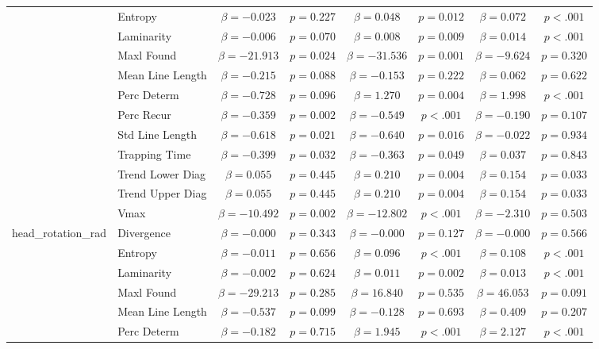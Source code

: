 \begin{tabular}{llcc|cc|cc}
 & Entropy & $\beta = -0.023$ & $p = 0.227$ & $\beta = 0.048$ & $p = 0.012$ & $\beta = 0.072$ & $p < .001$ \\
 & Laminarity & $\beta = -0.006$ & $p = 0.070$ & $\beta = 0.008$ & $p = 0.009$ & $\beta = 0.014$ & $p < .001$ \\
 & Maxl Found & $\beta = -21.913$ & $p = 0.024$ & $\beta = -31.536$ & $p = 0.001$ & $\beta = -9.624$ & $p = 0.320$ \\
 & Mean Line Length & $\beta = -0.215$ & $p = 0.088$ & $\beta = -0.153$ & $p = 0.222$ & $\beta = 0.062$ & $p = 0.622$ \\
 & Perc Determ & $\beta = -0.728$ & $p = 0.096$ & $\beta = 1.270$ & $p = 0.004$ & $\beta = 1.998$ & $p < .001$ \\
 & Perc Recur & $\beta = -0.359$ & $p = 0.002$ & $\beta = -0.549$ & $p < .001$ & $\beta = -0.190$ & $p = 0.107$ \\
 & Std Line Length & $\beta = -0.618$ & $p = 0.021$ & $\beta = -0.640$ & $p = 0.016$ & $\beta = -0.022$ & $p = 0.934$ \\
 & Trapping Time & $\beta = -0.399$ & $p = 0.032$ & $\beta = -0.363$ & $p = 0.049$ & $\beta = 0.037$ & $p = 0.843$ \\
 & Trend Lower Diag & $\beta = 0.055$ & $p = 0.445$ & $\beta = 0.210$ & $p = 0.004$ & $\beta = 0.154$ & $p = 0.033$ \\
 & Trend Upper Diag & $\beta = 0.055$ & $p = 0.445$ & $\beta = 0.210$ & $p = 0.004$ & $\beta = 0.154$ & $p = 0.033$ \\
 & Vmax & $\beta = -10.492$ & $p = 0.002$ & $\beta = -12.802$ & $p < .001$ & $\beta = -2.310$ & $p = 0.503$ \\
\midrule
\multirow{12}{*}{head_rotation_rad} & Divergence & $\beta = -0.000$ & $p = 0.343$ & $\beta = -0.000$ & $p = 0.127$ & $\beta = -0.000$ & $p = 0.566$ \\
 & Entropy & $\beta = -0.011$ & $p = 0.656$ & $\beta = 0.096$ & $p < .001$ & $\beta = 0.108$ & $p < .001$ \\
 & Laminarity & $\beta = -0.002$ & $p = 0.624$ & $\beta = 0.011$ & $p = 0.002$ & $\beta = 0.013$ & $p < .001$ \\
 & Maxl Found & $\beta = -29.213$ & $p = 0.285$ & $\beta = 16.840$ & $p = 0.535$ & $\beta = 46.053$ & $p = 0.091$ \\
 & Mean Line Length & $\beta = -0.537$ & $p = 0.099$ & $\beta = -0.128$ & $p = 0.693$ & $\beta = 0.409$ & $p = 0.207$ \\
 & Perc Determ & $\beta = -0.182$ & $p = 0.715$ & $\beta = 1.945$ & $p < .001$ & $\beta = 2.127$ & $p < .001$ \\

\end{tabular}
